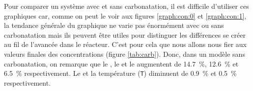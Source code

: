 \documentclass[11pt]{report}
\begin{document}
            \par
            Pour comparer un système avec et sans carbonatation,
            il est difficile d'utiliser ces graphiques car,
            comme on peut le voir aux figures \ref{graph:con:0} et \ref{graph:con:1},
            la tendance générale du graphique ne varie pas énormément avec ou sans carbonatation mais ils peuvent être utiles 
            pour distinguer les différences se créer au fil de l'avancée dans le réacteur.
            C'est pour cela que nous allons nous fier aux valeurs finales des concentrations (figure \ref{tab:carb}).
            Donc, dans un modèle sans carbonatation, on remarque que le , le 
            et le  augmentent de \SI{14.7}{\percent}, \SI{12.6}{\percent} et \SI{6.5}{\percent} respectivement.
            Le  et la température (\verb|T|) diminuent de \SI{0.9}{\percent} et \SI{0.5}{\percent} respectivement.
\end{document}
